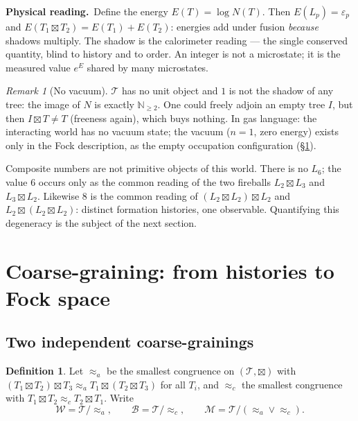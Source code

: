 \documentclass[11pt]{article}
\newcommand{\cT}{\mathcal{T}}   %
\newcommand{\cW}{\mathcal{W}}   %
\newcommand{\cB}{\mathcal{B}}   %
\newcommand{\cM}{\mathcal{M}}   %
\newcommand{\NN}{\mathbb{N}}
\newcommand{\physread}{\medskip\noindent\textbf{Physical reading.}\ }
\numberwithin{equation}{section}
\theoremstyle{plain}
\theoremstyle{definition}
\newtheorem{definition}[theorem]{Definition}
\theoremstyle{remark}
\newtheorem{remark}[theorem]{Remark}
\begin{document}
\physread Define the energy $E(T) = \log N(T)$. Then $E(L_p) = \varepsilon_p$ and
$E(T_1 \boxtimes T_2) = E(T_1) + E(T_2)$: energies add under fusion \emph{because}
shadows multiply. The shadow is the calorimeter reading --- the single conserved
quantity, blind to history and to order. An integer is not a microstate; it is the
measured value $e^{E}$ shared by many microstates.

\begin{remark}[No vacuum]\label{rem:nounit}
$\cT$ has no unit object and $1$ is not the shadow of any tree: the image of
$N$ is exactly $\NN_{\ge 2}$. One could freely adjoin an empty tree $I$, but then
$I \boxtimes T \neq T$ (freeness again), which buys nothing. In gas language: the
interacting world has no vacuum state; the vacuum ($n = 1$, zero energy) exists only
in the Fock description, as the empty occupation configuration
(\S\ref{sec:square}).
\end{remark}

Composite numbers are not primitive objects of this world. There is no $L_6$; the
value $6$ occurs only as the common reading of the two fireballs $L_2\boxtimes L_3$
and $L_3\boxtimes L_2$. Likewise $8$ is the common reading of
$(L_2\boxtimes L_2)\boxtimes L_2$ and $L_2\boxtimes(L_2\boxtimes L_2)$: distinct
formation histories, one observable. Quantifying this degeneracy is the subject of the
next section.

\section{Coarse-graining: from histories to Fock space}\label{sec:square}

\subsection{Two independent coarse-grainings}

\begin{definition}\label{def:congruences}
Let $\approx_a$ be the smallest congruence on $(\cT,\boxtimes)$ with
$(T_1\boxtimes T_2)\boxtimes T_3 \approx_a T_1\boxtimes(T_2\boxtimes T_3)$ for all
$T_i$, and $\approx_c$ the smallest congruence with
$T_1\boxtimes T_2 \approx_c T_2\boxtimes T_1$. Write
\[
\cW = \cT/\!\approx_a, \qquad
\cB = \cT/\!\approx_c, \qquad
\cM = \cT/(\approx_a \vee \approx_c).
\]
\end{definition}
\end{document}

